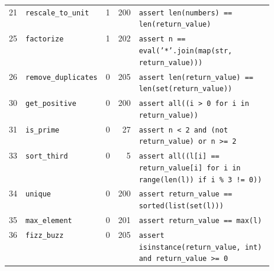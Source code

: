 \begin{footnotesize}
\begin{longtable}{@{}r l r r p{0.52\linewidth}@{}}
21 & \texttt{rescale\_to\_unit} & 1 & 200 & \texttt{assert \allowbreak{}len(\allowbreak{}numbers)\allowbreak{} \allowbreak{}=\allowbreak{}=\allowbreak{} \allowbreak{}len(\allowbreak{}return\_value)\allowbreak{}} \\
25 & \texttt{factorize} & 1 & 202 & \texttt{assert \allowbreak{}n \allowbreak{}=\allowbreak{}=\allowbreak{} \allowbreak{}eval(\allowbreak{}'\allowbreak{}*\allowbreak{}'\allowbreak{}.\allowbreak{}join(\allowbreak{}map(\allowbreak{}str,\allowbreak{} \allowbreak{}return\_value)\allowbreak{})\allowbreak{})\allowbreak{}} \\
26 & \texttt{remove\_duplicates} & 0 & 205 & \texttt{assert \allowbreak{}len(\allowbreak{}return\_value)\allowbreak{} \allowbreak{}=\allowbreak{}=\allowbreak{} \allowbreak{}len(\allowbreak{}set(\allowbreak{}return\_value)\allowbreak{})\allowbreak{}} \\
30 & \texttt{get\_positive} & 0 & 200 & \texttt{assert \allowbreak{}all(\allowbreak{}(\allowbreak{}i \allowbreak{}>\allowbreak{} \allowbreak{}0 \allowbreak{}for \allowbreak{}i \allowbreak{}in \allowbreak{}return\_value)\allowbreak{})\allowbreak{}} \\
31 & \texttt{is\_prime} & 0 & 27 & \texttt{assert \allowbreak{}n \allowbreak{}<\allowbreak{} \allowbreak{}2 \allowbreak{}and \allowbreak{}(\allowbreak{}not \allowbreak{}return\_value)\allowbreak{} \allowbreak{}or \allowbreak{}n \allowbreak{}>\allowbreak{}=\allowbreak{} \allowbreak{}2} \\
33 & \texttt{sort\_third} & 0 & 5 & \texttt{assert \allowbreak{}all(\allowbreak{}(\allowbreak{}l[\allowbreak{}i]\allowbreak{} \allowbreak{}=\allowbreak{}=\allowbreak{} \allowbreak{}return\_value[\allowbreak{}i]\allowbreak{} \allowbreak{}for \allowbreak{}i \allowbreak{}in \allowbreak{}range(\allowbreak{}len(\allowbreak{}l)\allowbreak{})\allowbreak{} \allowbreak{}if \allowbreak{}i \allowbreak{}\% \allowbreak{}3 \allowbreak{}!=\allowbreak{} \allowbreak{}0)\allowbreak{})\allowbreak{}} \\
34 & \texttt{unique} & 0 & 200 & \texttt{assert \allowbreak{}return\_value \allowbreak{}=\allowbreak{}=\allowbreak{} \allowbreak{}sorted(\allowbreak{}list(\allowbreak{}set(\allowbreak{}l)\allowbreak{})\allowbreak{})\allowbreak{}} \\
35 & \texttt{max\_element} & 0 & 201 & \texttt{assert \allowbreak{}return\_value \allowbreak{}=\allowbreak{}=\allowbreak{} \allowbreak{}max(\allowbreak{}l)\allowbreak{}} \\
36 & \texttt{fizz\_buzz} & 0 & 205 & \texttt{assert \allowbreak{}isinstance(\allowbreak{}return\_value,\allowbreak{} \allowbreak{}int)\allowbreak{} \allowbreak{}and \allowbreak{}return\_value \allowbreak{}>\allowbreak{}=\allowbreak{} \allowbreak{}0} \\

\end{longtable}
\end{footnotesize}
